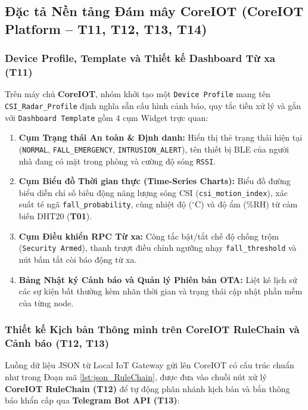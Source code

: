 \documentclass{hcmut-report}
\begin{document}
\subsection[Đặc tả Nền tảng Đám mây CoreIOT (T11--T14)]{Đặc tả Nền tảng Đám mây CoreIOT (CoreIOT Platform -- T11, T12, T13, T14)}

\subsubsection[Device Profile, Template và Dashboard (T11)]{Device Profile, Template và Thiết kế Dashboard Từ xa (T11)}
Trên máy chủ \textbf{CoreIOT}, nhóm khởi tạo một \texttt{Device Profile} mang tên \texttt{CSI\_Radar\_Profile} định nghĩa sẵn cấu hình cảnh báo, quy tắc tiền xử lý và gắn với \texttt{Dashboard Template} gồm 4 cụm Widget trực quan:
\begin{enumerate}
  \item \textbf{Cụm Trạng thái An toàn \& Định danh:} Hiển thị thẻ trạng thái hiện tại (\texttt{NORMAL}, \texttt{FALL\_EMERGENCY}, \texttt{INTRUSION\_ALERT}), tên thiết bị BLE của người nhà đang có mặt trong phòng và cường độ sóng \texttt{RSSI}.
  \item \textbf{Cụm Biểu đồ Thời gian thực (Time-Series Charts):} Biểu đồ đường biểu diễn chỉ số biến động năng lượng sóng CSI (\texttt{csi\_motion\_index}), xác suất té ngã \texttt{fall\_probability}, cùng nhiệt độ ($^\circ\text{C}$) và độ ẩm ($\%\text{RH}$) từ cảm biến DHT20 (\textbf{T01}).
  \item \textbf{Cụm Điều khiển RPC Từ xa:} Công tắc bật/tắt chế độ chống trộm (\texttt{Security Armed}), thanh trượt điều chỉnh ngưỡng nhạy \texttt{fall\_threshold} và nút bấm tắt còi báo động từ xa.
  \item \textbf{Bảng Nhật ký Cảnh báo và Quản lý Phiên bản OTA:} Liệt kê lịch sử các sự kiện bất thường kèm nhãn thời gian và trạng thái cập nhật phần mềm của từng node.
\end{enumerate}

\subsubsection[Kịch bản CoreIOT RuleChain và Cảnh báo (T12, T13)]{Thiết kế Kịch bản Thông minh trên CoreIOT RuleChain và Cảnh báo (T12, T13)}
Luồng dữ liệu JSON từ Local IoT Gateway gửi lên CoreIOT có cấu trúc chuẩn như trong Đoạn mã \ref{lst:json_RuleChain}, được đưa vào chuỗi nút xử lý \textbf{CoreIOT RuleChain (\textbf{T12})} để tự động phân nhánh kịch bản và bắn thông báo khẩn cấp qua \textbf{Telegram Bot API (\textbf{T13})}:
\end{document}
